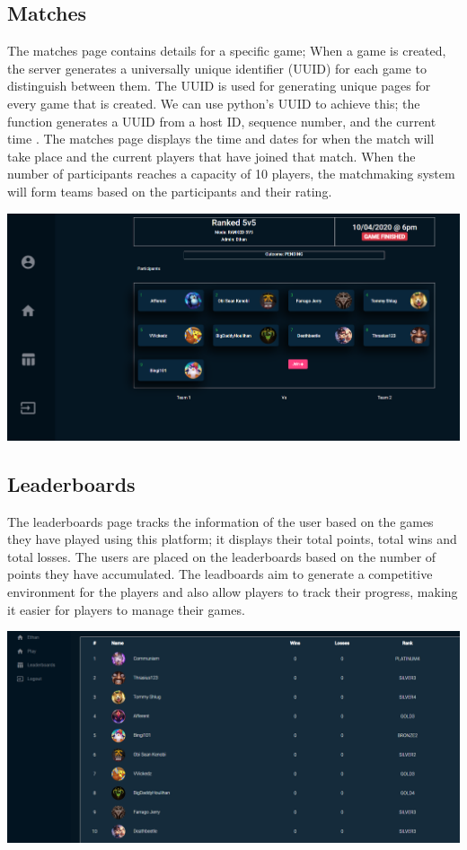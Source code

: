 \subsection{Matches}

The matches page contains details for a specific game; When a game is created, the server generates a universally unique identifier (UUID) for each game to distinguish between them. The UUID is used for generating unique pages for every game that is created. We can use python's UUID to achieve this; the function generates a UUID from a host ID, sequence number, and the current time \cite{pythonuuid}. \hfill \break
The matches page displays the time and dates for when the match will take place and the current players that have joined that match. When the number of participants reaches a capacity of 10 players, the matchmaking system will form teams based on the participants and their rating.
\begin{center}    
	\includegraphics[width=\textwidth,height=\textheight,keepaspectratio]{img/ViewMatch.png}
\end{center}

\subsection{Leaderboards}
The leaderboards page tracks the information of the user based on the games they have played using this platform; it displays their total points, total wins and total losses. The users are placed on the leaderboards based on the number of points they have accumulated. The leadboards aim to generate a competitive environment for the players and also allow players to track their progress, making it easier for players to manage their games.
\begin{center}    
	\includegraphics[width=\textwidth,height=\textheight,keepaspectratio]{img/Leaderboards.png}
\end{center}


